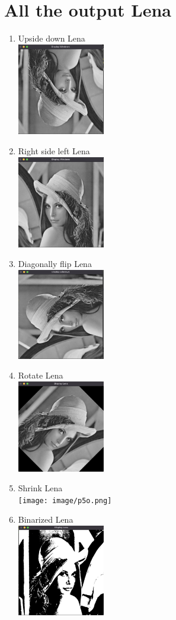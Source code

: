 \documentclass[12pt,a4paper]{article}
\begin{document}
\section*{All the output Lena}
\begin{enumerate}[label=(\alph*)]
	\item Upside down Lena\\ \includegraphics[width=0.3\textwidth]{image/p1o.png}
	\item Right side left Lena\\ \includegraphics[width=0.3\textwidth]{image/p2o.png}
	\item Diagonally flip Lena\\ \includegraphics[width=0.3\textwidth]{image/p3o.png}
	\item Rotate Lena\\ \includegraphics[width=0.3\textwidth]{image/p4o.png}
	\item Shrink Lena\\ \texttt{[image: image/p5o.png]}
	\item Binarized Lena\\ \includegraphics[width=0.3\textwidth]{image/p6o.png}
\end{enumerate}
\end{document}
